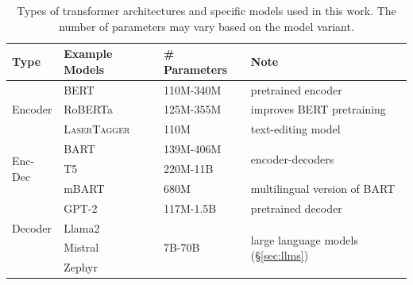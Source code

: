 {\begin{table}[t]
    \footnotesize
    \centering
    \begin{tabular}{lllp{4.5cm}}
        \toprule
        \textbf{Type}            & \textbf{Example Models}                              & \textbf{\# Parameters}  & \textbf{Note}                                            \\
        \midrule
        \multirow{3}{*}{Encoder} & BERT \cite{devlinBERTPretrainingDeep2019}            & 110M-340M               & pretrained encoder                                       \\
                                 & RoBERTa \cite{liuRoBERTaRobustlyOptimized2019}       & 125M-355M               & improves BERT pretraining                                \\
                                 & \textsc{LaserTagger} \cite{malmi2019lasertagger}     & 110M                    & text-editing model                                       \\
        \midrule
        \multirow{3}{*}{Enc-Dec} & BART \cite{lewisBARTDenoisingSequencetoSequence2019} & 139M-406M               & \multirow{2}{*}{encoder-decoders}                        \\
                                 & T5 \cite{raffelExploringLimitsTransfer2019}          & 220M-11B                &                                                          \\
                                 & mBART \cite{liuMultilingualDenoisingPretraining2020} & 680M                    & multilingual version of BART                             \\
        \midrule
        \multirow{3}{*}{Decoder} & GPT-2 \cite{radfordLanguageModelsAre2019}            & 117M-1.5B               & pretrained decoder                                       \\
                                 & Llama2 \cite{touvronLlamaOpenFoundation2023}         & \multirow{3}{*}{7B-70B} & \multirow{3}{*}{large language models (§\ref{sec:llms})} \\
                                 & Mistral \cite{jiangMistral7B2023}                    &                         &                                                          \\
                                 & Zephyr \cite{tunstallZephyrDirectDistillation2023}   &                         &                                                          \\
        \bottomrule
    \end{tabular}
    \caption[Transformer architectures and models.]{Types of transformer architectures and specific models used in this work. The number of parameters may vary based on the model variant.}
    \label{tab:pretrained_models}
\end{table}


}
